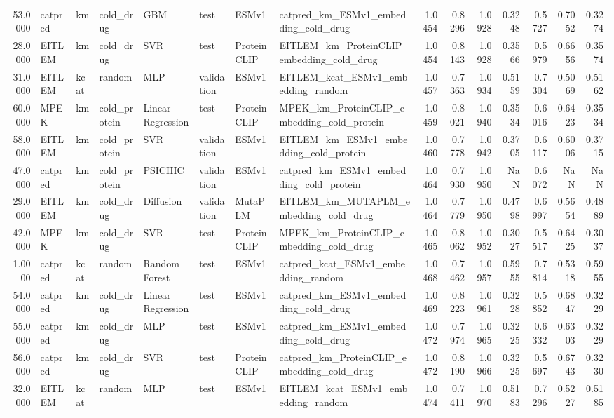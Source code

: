 \begin{tabular}{rlllllllrrrrrrr}
53.0000 & catpred & km & cold_drug & GBM & test & ESMv1 & catpred_km_ESMv1_embedding_cold_drug & 1.0454 & 0.8296 & 1.0928 & 0.3248 & 0.5727 & 0.7052 & 0.3274 \\
28.0000 & EITLEM & km & cold_drug & SVR & test & ProteinCLIP & EITLEM_km_ProteinCLIP_embedding_cold_drug & 1.0454 & 0.8143 & 1.0928 & 0.3566 & 0.5979 & 0.6656 & 0.3574 \\
31.0000 & EITLEM & kcat & random & MLP & validation & ESMv1 & EITLEM_kcat_ESMv1_embedding_random & 1.0457 & 0.7363 & 1.0934 & 0.5159 & 0.7304 & 0.5069 & 0.5162 \\
60.0000 & MPEK & km & cold_protein & Linear Regression & test & ProteinCLIP & MPEK_km_ProteinCLIP_embedding_cold_protein & 1.0459 & 0.8021 & 1.0940 & 0.3534 & 0.6016 & 0.6423 & 0.3534 \\
58.0000 & EITLEM & km & cold_protein & SVR & validation & ESMv1 & EITLEM_km_ESMv1_embedding_cold_protein & 1.0460 & 0.7778 & 1.0942 & 0.3705 & 0.6117 & 0.6006 & 0.3715 \\
47.0000 & catpred & km & cold_protein & PSICHIC & validation & ESMv1 & catpred_km_ESMv1_embedding_cold_protein & 1.0464 & 0.7930 & 1.0950 & NaN & 0.6072 & NaN & NaN \\
29.0000 & EITLEM & km & cold_drug & Diffusion & validation & MutaPLM & EITLEM_km_MUTAPLM_embedding_cold_drug & 1.0464 & 0.7779 & 1.0950 & 0.4798 & 0.6997 & 0.5654 & 0.4889 \\
42.0000 & MPEK & km & cold_drug & SVR & test & ProteinCLIP & MPEK_km_ProteinCLIP_embedding_cold_drug & 1.0465 & 0.8062 & 1.0952 & 0.3027 & 0.5517 & 0.6425 & 0.3037 \\
1.0000 & catpred & kcat & random & Random Forest & test & ESMv1 & catpred_kcat_ESMv1_embedding_random & 1.0468 & 0.7462 & 1.0957 & 0.5955 & 0.7814 & 0.5318 & 0.5955 \\
54.0000 & catpred & km & cold_drug & Linear Regression & test & ESMv1 & catpred_km_ESMv1_embedding_cold_drug & 1.0469 & 0.8223 & 1.0961 & 0.3228 & 0.5852 & 0.6847 & 0.3229 \\
55.0000 & catpred & km & cold_drug & MLP & test & ESMv1 & catpred_km_ESMv1_embedding_cold_drug & 1.0472 & 0.7974 & 1.0965 & 0.3225 & 0.6332 & 0.6303 & 0.3229 \\
56.0000 & catpred & km & cold_drug & SVR & test & ProteinCLIP & catpred_km_ProteinCLIP_embedding_cold_drug & 1.0472 & 0.8190 & 1.0966 & 0.3225 & 0.5697 & 0.6743 & 0.3230 \\
32.0000 & EITLEM & kcat & random & MLP & test & ESMv1 & EITLEM_kcat_ESMv1_embedding_random & 1.0474 & 0.7411 & 1.0970 & 0.5183 & 0.7296 & 0.5227 & 0.5185 \\

\end{tabular}
